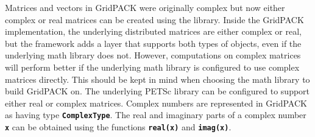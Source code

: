 Matrices and vectors in GridPACK were originally complex but now either complex or real matrices can be created using the library. Inside the GridPACK implementation, the underlying distributed matrices are either complex or real, but the framework adds a layer that supports both types of objects, even if the underlying math library does not. However, computations on complex matrices will perform better if the underlying math library is configured to use complex matrices directly. This should be kept in mind when choosing the math library to build GridPACK on. The underlying PETSc library can be configured to support either real or complex matrices. Complex numbers are represented in GridPACK as having type \texttt{\textbf{ComplexType}}. The real and imaginary parts of a complex number \texttt{\textbf{x}} can be obtained using the functions \texttt{\textbf{real(x)}} and \texttt{\textbf{imag(x)}}.
